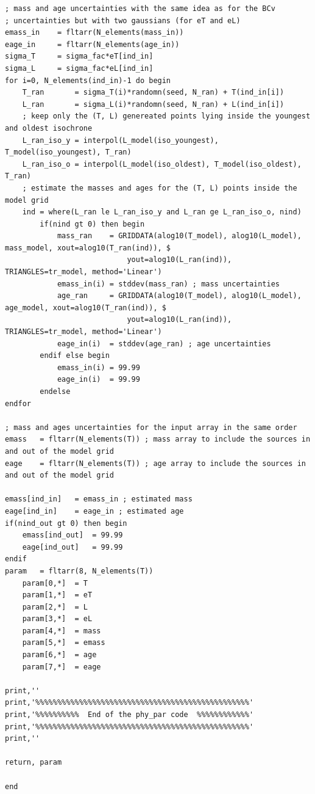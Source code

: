 \documentclass[12pt]{article}
\begin{document}
{\begin{Verbatim}[tabsize=4]
; mass and age uncertainties with the same idea as for the BCv 
; uncertainties but with two gaussians (for eT and eL)
emass_in	= fltarr(N_elements(mass_in))
eage_in		= fltarr(N_elements(age_in))
sigma_T		= sigma_fac*eT[ind_in]
sigma_L		= sigma_fac*eL[ind_in]
for i=0, N_elements(ind_in)-1 do begin
	T_ran		= sigma_T(i)*randomn(seed, N_ran) + T(ind_in[i])
	L_ran		= sigma_L(i)*randomn(seed, N_ran) + L(ind_in[i])
	; keep only the (T, L) genereated points lying inside the youngest and oldest isochrone
	L_ran_iso_y	= interpol(L_model(iso_youngest), T_model(iso_youngest), T_ran)
	L_ran_iso_o	= interpol(L_model(iso_oldest), T_model(iso_oldest), T_ran)
	; estimate the masses and ages for the (T, L) points inside the model grid
	ind	= where(L_ran le L_ran_iso_y and L_ran ge L_ran_iso_o, nind)
		if(nind gt 0) then begin
			mass_ran	= GRIDDATA(alog10(T_model), alog10(L_model), mass_model, xout=alog10(T_ran(ind)), $
							yout=alog10(L_ran(ind)), TRIANGLES=tr_model, method='Linear')
			emass_in(i)	= stddev(mass_ran) ; mass uncertainties
			age_ran		= GRIDDATA(alog10(T_model), alog10(L_model), age_model, xout=alog10(T_ran(ind)), $
							yout=alog10(L_ran(ind)), TRIANGLES=tr_model, method='Linear')
			eage_in(i)	= stddev(age_ran) ; age uncertainties
		endif else begin
			emass_in(i)	= 99.99
			eage_in(i)	= 99.99
		endelse
endfor

; mass and ages uncertainties for the input array in the same order
emass	= fltarr(N_elements(T)) ; mass array to include the sources in and out of the model grid
eage	= fltarr(N_elements(T)) ; age array to include the sources in and out of the model grid

emass[ind_in]	= emass_in ; estimated mass
eage[ind_in]	= eage_in ; estimated age
if(nind_out gt 0) then begin
	emass[ind_out]	= 99.99
	eage[ind_out]	= 99.99
endif
param	= fltarr(8, N_elements(T))
	param[0,*]	= T
	param[1,*]	= eT
	param[2,*]	= L
	param[3,*]	= eL
	param[4,*]	= mass
	param[5,*]	= emass
	param[6,*]	= age
	param[7,*]	= eage

print,''
print,'%%%%%%%%%%%%%%%%%%%%%%%%%%%%%%%%%%%%%%%%%%%%%%%%%'
print,'%%%%%%%%%%  End of the phy_par code  %%%%%%%%%%%%'
print,'%%%%%%%%%%%%%%%%%%%%%%%%%%%%%%%%%%%%%%%%%%%%%%%%%'
print,''

return, param

end
\end{Verbatim}
}

\small
\setlength{\bibsep}{0pt plus 0.4ex}
\end{document}
